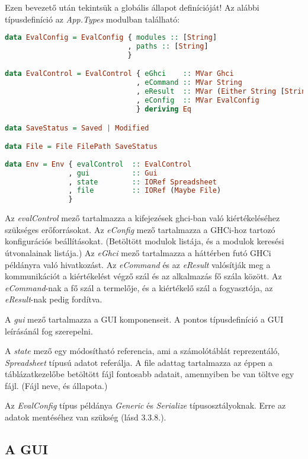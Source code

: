 Ezen bevezető után tekintsük a globális állapot definícióját! Az alábbi típusdefiníció az \textit{App.Types} modulban található:
\begin{lstlisting}[language={Haskell}, label=src:env]
data EvalConfig = EvalConfig { modules :: [String]
                             , paths :: [String]
                             }

data EvalControl = EvalControl { eGhci    :: MVar Ghci
                               , eCommand :: MVar String
                               , eResult  :: MVar (Either String [String])
                               , eConfig  :: MVar EvalConfig 
                               } deriving Eq

data SaveStatus = Saved | Modified

data File = File FilePath SaveStatus
  
data Env = Env { evalControl  :: EvalControl
               , gui          :: Gui
               , state        :: IORef Spreadsheet
               , file         :: IORef (Maybe File)
               }
\end{lstlisting}

Az \textit{evalControl} mező tartalmazza a kifejezések ghci-ban való kiértékeléséhez szükséges erőforrásokat. Az \textit{eConfig} mező tartalmazza a GHCi-hoz tartozó konfigurációs beállításokat. (Betöltött modulok listája, és a modulok keresési útvonalainak listája.) Az \textit{eGhci} mező tartalmazza a háttérben futó GHCi példányra való hivatkozást. Az \textit{eCommand} és az \textit{eResult} valósítják meg a kommunikációt a kiértékelést végző szál és az alkalmazás fő szála között. Az \textit{eCommand}-nak a fő szál a termelője, és a kiértékelő szál a fogyasztója, az \textit{eResult}-nak pedig fordítva.

A \textit{gui} mező tartalmazza a GUI komponenseit. A pontos típusdefiníció a GUI leírásánál fog szerepelni.

A \textit{state} mező egy módosítható referencia, ami a számolótáblát reprezentáló, \textit{Spreadsheet} típusú adatot referálja. A file adattag tartalmazza az éppen a táblázatkezelőbe betöltött fájl fontosabb adatait, amennyiben be van töltve egy fájl. (Fájl neve, és állapota.)

Az \textit{EvalConfig} típus példánya \textit{Generic} és \textit{Serialize} típusosztályoknak. Erre az adatok mentéséhez van szükség (lásd 3.3.8.).

\subsection{A GUI}

